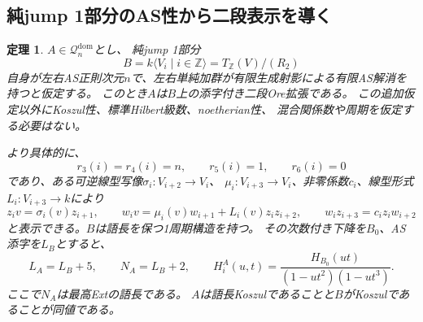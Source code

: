 \documentclass[11pt,a4paper]{ltjsarticle}
\newtheorem{theorem}{定理}[section]
\theoremstyle{definition}
\begin{document}
\subsection{純jump 1部分のAS性から二段表示を導く}
\begin{theorem}\label{genidx:thm:as-base-ore}
$A\in\mathcal Q_n^{\mathrm{dom}}$とし、
純jump 1部分
\[
B=k\langle V_i\mid i\in\mathbb Z\rangle
=T_{\mathbb Z}(V)/(R_2)
\]
自身が左右AS正則次元$n$で、左右単純加群が有限生成射影による有限AS解消を持つと仮定する。
このとき$A$は$B$上の添字付き二段Ore拡張である。
この追加仮定以外にKoszul性、標準Hilbert級数、noetherian性、
混合関係数や周期を仮定する必要はない。

より具体的に、
\[
r_3(i)=r_4(i)=n,\qquad r_5(i)=1,\qquad r_6(i)=0
\]
であり、ある可逆線型写像$\sigma_i:V_{i+2}\to V_i$、
$\mu_i:V_{i+3}\to V_i$、非零係数$c_i$、線型形式$L_i:V_{i+3}\to k$により
\[
z_i v=\sigma_i(v)z_{i+1},\qquad
w_i v=\mu_i(v)w_{i+1}+L_i(v)z_i z_{i+2},\qquad
w_i z_{i+3}=c_i z_i w_{i+2}
\]
と表示できる。$B$は語長を保つ1周期構造を持つ。
その次数付き下降を$B_0$、AS添字を$L_B$とすると、
\[
L_A=L_B+5,\qquad N_A=L_B+2,\qquad
H_i^A(u,t)=\frac{H_{B_0}(ut)}{(1-ut^2)(1-ut^3)}.
\]
ここで$N_A$は最高Extの語長である。
$A$は語長Koszulであることと$B$がKoszulであることが同値である。
\end{theorem}
\end{document}
